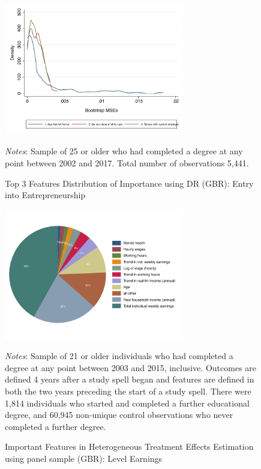 \documentclass[12pt, a4paper]{article}
\begin{document}
\begin{figure}[H]
\centering
\caption{Top 3 Features Distribution of Importance using DR (GBR): Entry into Entrepreneurship}
\vspace{0.5cm}
  \label{fig:dengbrlevDRe} 
    \includegraphics[width=0.7\textwidth]{_figures/density_GBR_chself_100_top3_DR.pdf}
\parbox{1\textwidth}{\footnotesize{\textit{Notes}: Sample of 25 or older who had completed a degree at any point between 2002 and 2017. Total number of observations 5,441.}}
\end{figure}

\begin{figure}[H]
\centering
\caption{Important Features in Heterogeneous Treatment Effects Estimation using panel sample (GBR): Level Earnings}
\vspace{0.5cm}
  \label{fig:featgbr_panel}
    \includegraphics[width=0.7\textwidth]{_figures/influenceP_GBR_csnopoly.pdf}
\parbox{1\textwidth}{\footnotesize{\textit{Notes}: Sample of 21 or older individuals who had completed a degree at any point between 2003 and 2015, inclusive. Outcomes are defined 4 years after a study spell began and features are defined in both the two years preceding the start of a study spell. There were 1,814 individuals who started and completed a further educational degree, and 60,945 non-unique control observations who never completed a further degree.}}
\end{figure}
\end{document}
